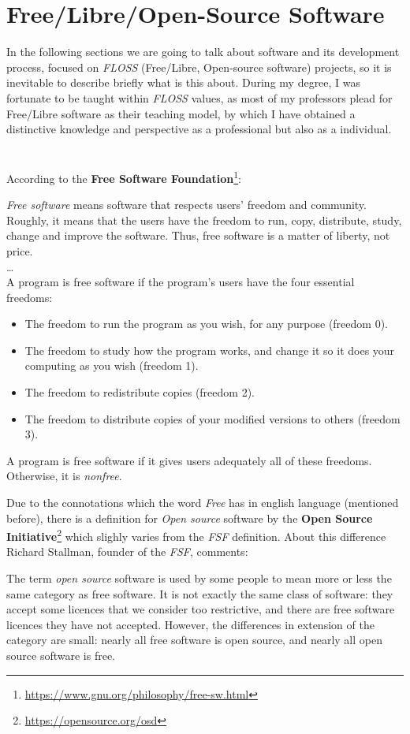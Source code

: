 \documentclass[a4paper, 12pt]{book}
\begin{document}
\section{Free/Libre/Open-Source Software}
\label{sec:floss-definition}
In the following sections we are going to talk about software and its development process, focused on \emph{FLOSS} (Free/Libre, Open-source
software) projects, so it is inevitable to describe briefly what is this about.
During my degree, I was fortunate to be taught within \emph{FLOSS} values, as most of my professors plead
for Free/Libre software as their teaching model, by which I have obtained a distinctive knowledge and perspective as a professional but also as a individual.\\\\\\
According to the \textbf{Free Software Foundation}\footnote{\url{https://www.gnu.org/philosophy/free-sw.html}}:
\begin{displayquote}
    \emph{Free software} means software that respects users' freedom and community. Roughly, it means that the users have the freedom
    to run, copy, distribute, study, change and improve the software. Thus, free software is a matter of liberty, not price.\\
    \ldots\\
    A program is free software if the program's users have the four essential freedoms:
       \begin{itemize}
           \item The freedom to run the program as you wish, for any purpose (freedom 0).
           \item The freedom to study how the program works, and change it so it does your computing as you wish (freedom 1).
           \item The freedom to redistribute copies (freedom 2).
           \item The freedom to distribute copies of your modified versions to others (freedom 3).
       \end{itemize}
    A program is free software if it gives users adequately all of these freedoms. Otherwise, it is \textit{nonfree}.
\end{displayquote}
Due to the connotations which the word \emph{Free} has in english language (mentioned before), there is a definition
for \emph{Open source} software by the \textbf{Open Source Initiative}\footnote{\url{https://opensource.org/osd}} which
slighly varies from the \emph{FSF} definition. About this difference Richard Stallman, founder of the \emph{FSF}, comments:
\begin{displayquote}
The term \emph{open source} software is used by some people to mean more or less the same category as free software.
It is not exactly the same class of software: they accept some licences that we consider too restrictive,
and there are free software licences they have not accepted. However, the differences in extension of the
category are small: nearly all free software is open source, and nearly all open source software is free.
\end{displayquote}
\end{document}
